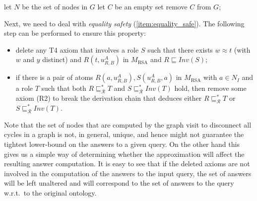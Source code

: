 \documentclass[runningheads]{llncs}
\newcommand{\alchoiq}{$\mathcal{ALCHOIQ}$\xspace}
\newcommand{\hornalchoiq}{Horn-\alchoiq\xspace}
\begin{document}
\begin{algorithm}[t]
    let $N$ be the set of nodes in $G$\;
    let $C$ be an empty set\;
    remove $C$ from $G$;
    \caption{Approximate an \hornalchoiq ontology to RSA}
    \label{listing:rsa_approximation}
\end{algorithm}

Next, we need to deal with \emph{equality safety} (\ref{item:equality_safe}).
The following step can be performed to ensure this property:
\begin{itemize}
    \item
        delete any T4 axiom that involves a role $S$ such that there exists $w \approx t$ (with $w$ and $y$ distinct) and $R(t,u^A_{R,B})$ in $M_\text{RSA}$ and $R \sqsubseteq Inv(S)$;
    \item
        if there is a pair of atoms $R(a,u^A_{R,B}), S(u^A_{R,B},a)$ in $M_\text{RSA}$ with $a \in N_I$ and a role $T$ such that both $R \sqsubseteq^*_\mathcal{R} T$ and $S \sqsubseteq^*_\mathcal{R} Inv(T)$ hold, then remove some axiom (R2) to break the derivation chain that deduces either $R \sqsubseteq^*_\mathcal{R} T$ or $S \sqsubseteq^*_\mathcal{R} Inv(T)$.
\end{itemize}

Note that the set of nodes that are computed by the graph visit to disconnect all cycles in a graph is not, in general, unique, and hence might not guarantee the tightest lower-bound on the answers to a given query.
On the other hand this gives us a simple way of determining whether the approximation will affect the resulting answer computation.
It is easy to see that if the deleted axioms are not involved in the computation of the answers to the input query, the set of answers will be left unaltered and will correspond to the set of answers to the query w.r.t.\ to the original ontology.
\end{document}
